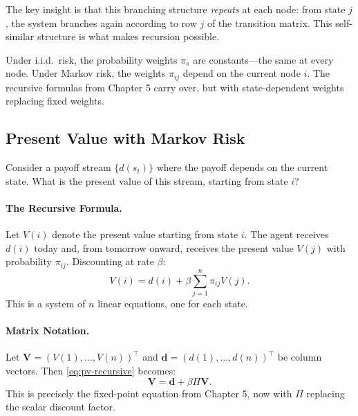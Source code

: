The key insight is that this branching structure \emph{repeats} at each node: from state $j$, the system branches again according to row $j$ of the transition matrix. This self-similar structure is what makes recursion possible.

\begin{calloutimportant}
Under i.i.d.\ risk, the probability weights $\pi_s$ are constants---the same at every node. Under Markov risk, the weights $\pi_{ij}$ depend on the current node $i$. The recursive formulas from Chapter 5 carry over, but with state-dependent weights replacing fixed weights.
\end{calloutimportant}

\subsection{Present Value with Markov Risk}
\label{subsec:present-value-markov}

Consider a payoff stream $\{d(s_t)\}$ where the payoff depends on the current state. What is the present value of this stream, starting from state $i$?

\paragraph{The Recursive Formula.}
Let $V(i)$ denote the present value starting from state $i$. The agent receives $d(i)$ today and, from tomorrow onward, receives the present value $V(j)$ with probability $\pi_{ij}$. Discounting at rate $\beta$:
\begin{equation}
V(i) = d(i) + \beta \sum_{j=1}^{n} \pi_{ij} V(j).
\label{eq:pv-recursive}
\end{equation}
This is a system of $n$ linear equations, one for each state.

\paragraph{Matrix Notation.}
Let $\mathbf{V} = (V(1), \ldots, V(n))^\top$ and $\mathbf{d} = (d(1), \ldots, d(n))^\top$ be column vectors. Then \eqref{eq:pv-recursive} becomes:
\begin{equation}
\mathbf{V} = \mathbf{d} + \beta \Pi \mathbf{V}.
\label{eq:pv-matrix}
\end{equation}
This is precisely the fixed-point equation from Chapter 5, now with $\Pi$ replacing the scalar discount factor.

